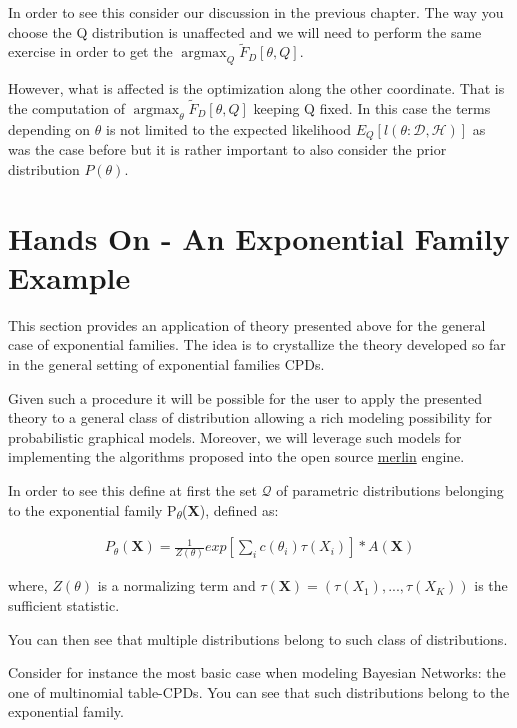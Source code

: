 \documentclass[11pt]{article}
\begin{document}
\begin{article}
In order to see this consider our discussion in the previous
chapter. The way you choose the Q distribution is unaffected and
we will need to perform the same exercise in order to get the
\(\operatorname*{argmax}_{Q} \tilde{F}_D[\theta, Q]\).

However, what is affected is the optimization along the other
coordinate. That is the computation of
\(\operatorname*{argmax}_{\theta} \tilde{F}_D[\theta, Q]\) keeping Q
fixed. In this case the terms depending on \(\theta\) is not limited to
the expected likelihood \(E_Q[l (\theta: \mathcal{D}, \mathcal{H})]\)
as was the case before but it is rather important to also consider
the prior distribution \(P(\theta)\).

\newpage

\section{Hands On - An Exponential Family Example}
\label{examples}
This section provides an application of theory presented above for
the general case of exponential families. The idea is to
crystallize the theory developed so far in the general setting of
exponential families CPDs.

Given such a procedure it will be possible for the user to apply the
presented theory to a general class of distribution allowing a rich
modeling possibility for probabilistic graphical models. Moreover, we
will leverage such models for implementing the algorithms proposed
into the open source \href{https://github.com/radum2275/merlin}{merlin} engine.

In order to see this define at first the set \(\mathscr{Q}\) of
parametric distributions belonging to the exponential family
P\textsubscript{\(\theta\)}(\textbf{X}), defined as:

\begin{align} \label{eq:exponential-family}
P_{\theta}(\textbf{X}) = \frac{1}{Z(\theta)} exp[\sum_i c(\theta_i)\tau(X_i)] * A(\textbf{X})
\end{align}

where, \(Z(\theta)\) is a normalizing term and \(\tau(\textbf{X}) = (\tau(X_1),
  ..., \tau(X_K))\) is the sufficient statistic.

You can then see that multiple distributions belong to such class
of distributions.

Consider for instance the most basic case when modeling Bayesian
Networks: the one of multinomial table-CPDs. You can see that
such distributions belong to the exponential family.


\end{article}
\end{document}
